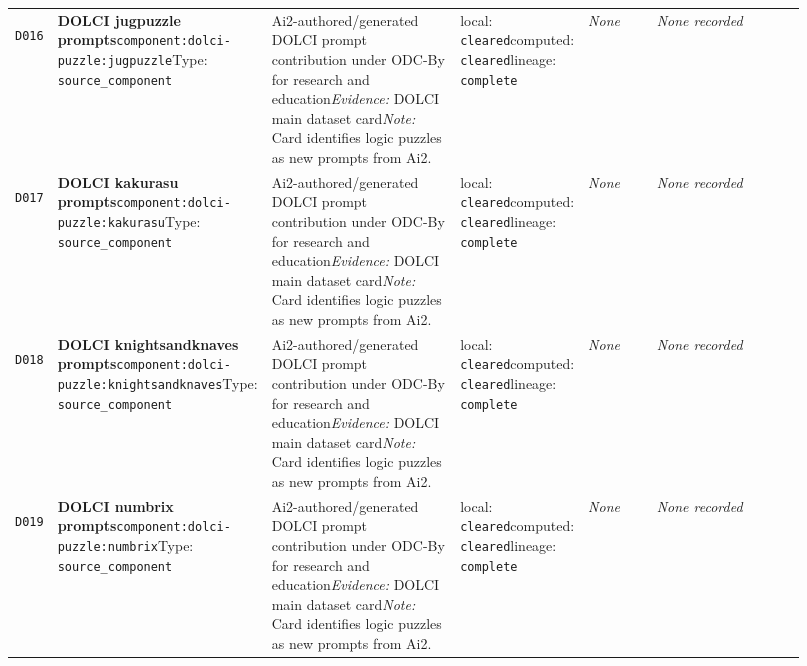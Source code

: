 \documentclass[9pt,a4paper]{article}
\newcommand{\depid}[1]{\hypertarget{dep:#1}{\texttt{#1}}}
\begin{document}
\begin{landscape}
\begin{longtable}{@{}L{0.035\linewidth}L{0.185\linewidth}L{0.27\linewidth}L{0.09\linewidth}L{0.10\linewidth}L{0.24\linewidth}@{}}
\depid{D016} & \textbf{DOLCI jugpuzzle prompts}\newline \nolinkurl{component:dolci-puzzle:jugpuzzle}\newline Type: \texttt{source\_component} & Ai2-authored/generated DOLCI prompt contribution under ODC-By for research and education\newline \textit{Evidence:} DOLCI main dataset card\newline \textit{Note:} Card identifies logic puzzles as new prompts from Ai2. & local: \texttt{cleared}\newline computed: \texttt{cleared}\newline lineage: \texttt{complete} & \textit{None} & \textit{None recorded} \\
\depid{D017} & \textbf{DOLCI kakurasu prompts}\newline \nolinkurl{component:dolci-puzzle:kakurasu}\newline Type: \texttt{source\_component} & Ai2-authored/generated DOLCI prompt contribution under ODC-By for research and education\newline \textit{Evidence:} DOLCI main dataset card\newline \textit{Note:} Card identifies logic puzzles as new prompts from Ai2. & local: \texttt{cleared}\newline computed: \texttt{cleared}\newline lineage: \texttt{complete} & \textit{None} & \textit{None recorded} \\
\depid{D018} & \textbf{DOLCI knightsandknaves prompts}\newline \nolinkurl{component:dolci-puzzle:knightsandknaves}\newline Type: \texttt{source\_component} & Ai2-authored/generated DOLCI prompt contribution under ODC-By for research and education\newline \textit{Evidence:} DOLCI main dataset card\newline \textit{Note:} Card identifies logic puzzles as new prompts from Ai2. & local: \texttt{cleared}\newline computed: \texttt{cleared}\newline lineage: \texttt{complete} & \textit{None} & \textit{None recorded} \\
\depid{D019} & \textbf{DOLCI numbrix prompts}\newline \nolinkurl{component:dolci-puzzle:numbrix}\newline Type: \texttt{source\_component} & Ai2-authored/generated DOLCI prompt contribution under ODC-By for research and education\newline \textit{Evidence:} DOLCI main dataset card\newline \textit{Note:} Card identifies logic puzzles as new prompts from Ai2. & local: \texttt{cleared}\newline computed: \texttt{cleared}\newline lineage: \texttt{complete} & \textit{None} & \textit{None recorded} \\

\end{longtable}
\end{landscape}
\end{document}

